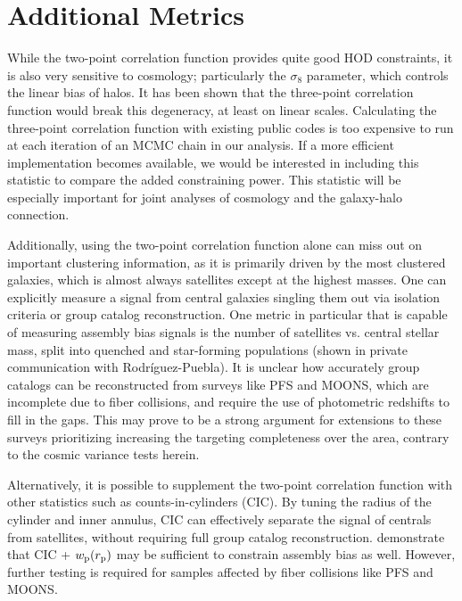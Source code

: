 \documentclass[twocolumn,twocolappendix]{aastex63}
\begin{document}
\section{Additional Metrics}
\label{sec:additional-metrics}

While the two-point correlation function provides quite good HOD constraints, it is also very sensitive to cosmology; particularly the $\sigma_8$ parameter, which controls the linear bias of halos. It has been shown \citep{Slepian:2017} that the three-point correlation function would break this degeneracy, at least on linear scales. Calculating the three-point correlation function with existing public codes is too expensive to run at each iteration of an MCMC chain in our analysis. If a more efficient implementation becomes available, we would be interested in including this statistic to compare the added constraining power. This statistic will be especially important for joint analyses of cosmology and the galaxy-halo connection.

Additionally, using the two-point correlation function alone can miss out on important clustering information, as it is primarily driven by the most clustered galaxies, which is almost always satellites except at the highest masses. One can explicitly measure a signal from central galaxies singling them out via isolation criteria or group catalog reconstruction. One metric in particular that is capable of measuring assembly bias signals is the number of satellites vs. central stellar mass, split into quenched and star-forming populations (shown in private communication with Rodr\'{i}guez-Puebla). It is unclear how accurately group catalogs can be reconstructed from surveys like PFS and MOONS, which are incomplete due to fiber collisions, and require the use of photometric redshifts to fill in the gaps. This may prove to be a strong argument for extensions to these surveys prioritizing increasing the {targeting} completeness over the area, contrary to the cosmic variance tests herein.

Alternatively, it is possible to supplement the two-point correlation function with other statistics such as counts-in-cylinders (CIC). By tuning the radius of the cylinder and inner annulus, CIC can effectively separate the signal of centrals from satellites, without requiring full group catalog reconstruction. \citet{Wang:2019} demonstrate that CIC + $w_{\rm p}(r_{\rm p})$ may be sufficient to constrain assembly bias as well. However, further testing is required for samples affected by fiber collisions like PFS and MOONS.
\end{document}
